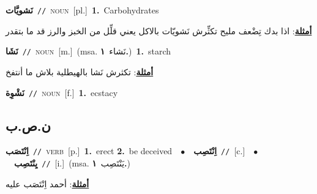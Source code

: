 \documentclass[10pt,a4paper,twoside]{article} %
\begin{document}
\begin{multicols}{2}
{\setlength\topsep{0pt}\textbf{\foreignlanguage{arabic}{نَشويَّات}}\ {\color{gray}\texttt{//}\color{black}}\ \textsc{noun}\ [pl.]\ \textbf{1.}~Carbohydrates\  \begin{flushright}\color{gray}\foreignlanguage{arabic}{\textbf{\underline{\foreignlanguage{arabic}{أمثلة}}}: اذا بدك تِضْعف مليح تكثِّرش نَشويّات بالاكل يعني قلِّل من الخبز والرز قد ما بتقدر}\end{flushright}\color{black}} \vspace{2mm}

{\setlength\topsep{0pt}\textbf{\foreignlanguage{arabic}{نَشَا}}\ {\color{gray}\texttt{//}\color{black}}\ \textsc{noun}\ [m.]\ \color{gray}(msa. \foreignlanguage{arabic}{نَشاء}~\foreignlanguage{arabic}{\textbf{١.}})\color{black}\ \textbf{1.}~starch\  \begin{flushright}\color{gray}\foreignlanguage{arabic}{\textbf{\underline{\foreignlanguage{arabic}{أمثلة}}}: تكثرش نَشا بالهيطلية بلاش ما أنتفخ}\end{flushright}\color{black}} \vspace{2mm}

{\setlength\topsep{0pt}\textbf{\foreignlanguage{arabic}{نَشْوِة}}\ {\color{gray}\texttt{//}\color{black}}\ \textsc{noun}\ [f.]\ \textbf{1.}~ecstacy\ } \vspace{2mm}

\vspace{-3mm}
\subsection*{\color{blue}\foreignlanguage{arabic}{ن.ص.ب}\color{blue}{}} 

{\setlength\topsep{0pt}\textbf{\foreignlanguage{arabic}{اِنْتَصَب}}\ {\color{gray}\texttt{//}\color{black}}\ \textsc{verb}\ [p.]\ \textbf{1.}~erect  \textbf{2.}~be deceived\ \ $\bullet$\ \ \setlength\topsep{0pt}\textbf{\foreignlanguage{arabic}{اِنْتَصِب}}\ {\color{gray}\texttt{//}\color{black}}\ [c.]\ \ $\bullet$\ \ \setlength\topsep{0pt}\textbf{\foreignlanguage{arabic}{يِنْتَصِب}}\ {\color{gray}\texttt{//}\color{black}}\ [i.]\ \color{gray}(msa. \foreignlanguage{arabic}{يَنْتَصِب}~\foreignlanguage{arabic}{\textbf{١.}})\color{black}\  \begin{flushright}\color{gray}\foreignlanguage{arabic}{\textbf{\underline{\foreignlanguage{arabic}{أمثلة}}}: أحمد اِنْتَصَب عليه}\end{flushright}\color{black}} \vspace{2mm}


\end{multicols}
\end{document}

